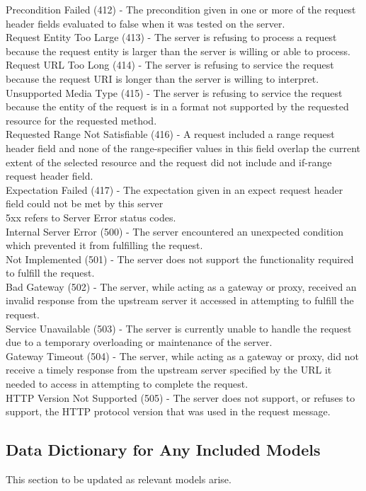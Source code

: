 \documentclass[titlepage]{article}
\begin{document}
Precondition Failed (412) - The precondition given in one or more of the request header fields evaluated to false when it was tested on the server. 
\\
Request Entity Too Large (413) - The server is refusing to process a request because the request entity is larger than the server is willing or able to process.
\\
Request URL Too Long (414) - The server is refusing to service the request because the request URI is longer than the server is willing to interpret.
\\
Unsupported Media Type (415) - The server is refusing to service the request because the entity of the request is in a format not supported by the requested resource for the requested method.
\\
Requested Range Not Satisfiable (416) - A request included a range request header field and none of the range-specifier values in this field overlap the current extent of the selected resource and the request did not include and if-range request header field.
\\
Expectation Failed (417) - The expectation given in an expect request header field could not be met by this server
\\
5xx refers to Server Error status codes.
\\
Internal Server Error (500) - The server encountered an unexpected condition which prevented it from fulfilling the request.
\\
Not Implemented (501) - The server does not support the functionality required to fulfill the request.
\\
Bad Gateway (502) - The server, while acting as a gateway or proxy, received an invalid response from the upstream server it accessed in attempting to fulfill the request.
\\
Service Unavailable (503) - The server is currently unable to handle the request due to a temporary overloading or maintenance of the server.
\\
Gateway Timeout (504) - The server, while acting as a gateway or proxy, did not receive a timely response from the upstream server specified by the URL it needed to access in attempting to complete the request.
\\
HTTP Version Not Supported (505) - The server does not support, or refuses to support, the HTTP protocol version that was used in the request message.
\\
\subsection*{Data Dictionary for Any Included Models}
This section to be updated as relevant models arise.
\end{document}
